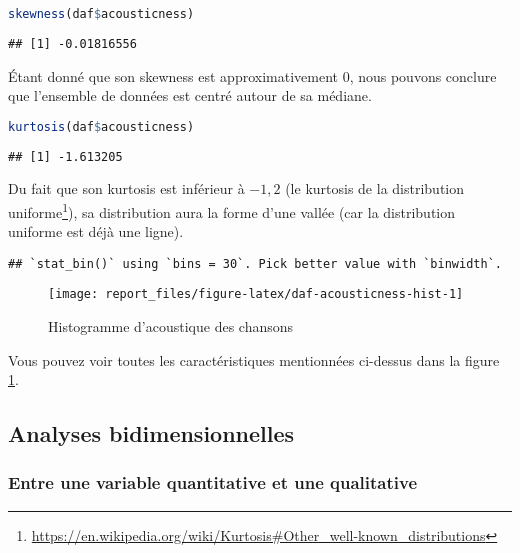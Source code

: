 \documentclass[
  11pt,
  xcolor = usenames,dvipsnames]{article}
\begin{document}
\begin{lstlisting}[language=R]
skewness(daf$acousticness)
\end{lstlisting}

\begin{lstlisting}
## [1] -0.01816556
\end{lstlisting}

Étant donné que son skewness est approximativement 0, nous pouvons conclure que
l'ensemble de données est centré autour de sa médiane.

\begin{lstlisting}[language=R]
kurtosis(daf$acousticness)
\end{lstlisting}

\begin{lstlisting}
## [1] -1.613205
\end{lstlisting}

Du fait que son kurtosis est inférieur à \(-1,2\) (le kurtosis de la distribution uniforme\footnote{\url{https://en.wikipedia.org/wiki/Kurtosis\#Other_well-known_distributions}}),
sa distribution aura la forme d'une vallée (car la distribution uniforme est déjà une ligne).

\begin{lstlisting}
## `stat_bin()` using `bins = 30`. Pick better value with `binwidth`.
\end{lstlisting}

\begin{figure}

{\centering \texttt{[image: report\_files/figure-latex/daf-acousticness-hist-1]} 

}

\caption{Histogramme d'acoustique des chansons}\label{fig:daf-acousticness-hist}
\end{figure}

Vous pouvez voir toutes les caractéristiques mentionnées ci-dessus dans la figure \ref{fig:daf-acousticness-hist}.

\hypertarget{analyses-bidimensionnelles}{%
\subsection{Analyses bidimensionnelles}\label{analyses-bidimensionnelles}}

\hypertarget{entre-une-variable-quantitative-et-une-qualitative}{%
\subsubsection{Entre une variable quantitative et une qualitative}\label{entre-une-variable-quantitative-et-une-qualitative}}
\end{document}
